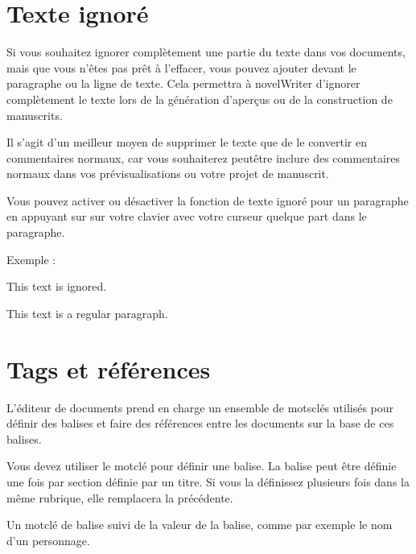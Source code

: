 \documentclass[a4paper,11pt,french]{sphinxmanual}
\begin{document}
\section{Texte ignoré}
\label{\detokenize{usage_format:ignored-text}}\label{\detokenize{usage_format:a-fmt-ignore}}
\sphinxAtStartPar
Si vous souhaitez ignorer complètement une partie du texte dans vos documents, mais que vous n’êtes pas prêt à l’effacer, vous pouvez ajouter \sphinxcode{\sphinxupquote{\%\textasciitilde{}}} devant le paragraphe ou la ligne de texte. Cela permettra à novelWriter d’ignorer complètement le texte lors de la génération d’aperçus ou de la construction de manuscrits.

\sphinxAtStartPar
Il s’agit d’un meilleur moyen de supprimer le texte que de le convertir en commentaires normaux, car vous souhaiterez peut\sphinxhyphen{}être inclure des commentaires normaux dans vos prévisualisations ou votre projet de manuscrit.

\sphinxAtStartPar
Vous pouvez activer ou désactiver la fonction de texte ignoré pour un paragraphe en appuyant sur  sur votre clavier avec votre curseur quelque part dans le paragraphe.

\sphinxAtStartPar
Exemple :

\begin{sphinxVerbatim}[commandchars=\\\{\}]
\PYGZpc{}\PYGZti{} This text is ignored.

This text is a regular paragraph.
\end{sphinxVerbatim}


\section{Tags et références}
\label{\detokenize{usage_format:tags-and-references}}\label{\detokenize{usage_format:a-fmt-tags}}
\sphinxAtStartPar
L’éditeur de documents prend en charge un ensemble de mots\sphinxhyphen{}clés utilisés pour définir des balises et faire des références entre les documents sur la base de ces balises.

\sphinxAtStartPar
Vous devez utiliser le mot\sphinxhyphen{}clé  pour définir une balise. La balise peut être définie une fois par section définie par un titre. Si vous la définissez plusieurs fois dans la même rubrique, elle remplacera la précédente.
\begin{description}
\sphinxAtStartPar
Un mot\sphinxhyphen{}clé de balise suivi de la valeur de la balise, comme par exemple le nom d’un personnage.

\end{description}
\end{document}
